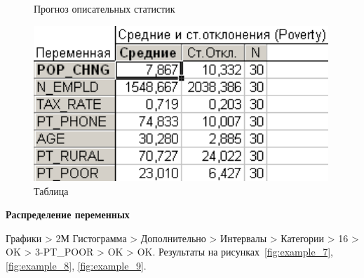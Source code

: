 \begin{figure}[!h]
\begin{minipage}{0.36\textwidth}
    \caption{Прогноз описательных статистик}
    \label{fig:example_5}
  \end{minipage}
  \begin{minipage}{0.24\textwidth}
    \centering

    \includegraphics[width=0.99\textwidth]
    {inc/example_6.PNG}

    \caption{Таблица}
    \label{fig:example_6}
  \end{minipage}
\end{figure}

\newpage

\begin{center}
  \textbf{Распределение переменных}
\end{center}

Графики > 2М Гистограмма > Дополнительно > Интервалы > Категории > 16 > OK
> 3-PT\_POOR > OK > OK. Результаты на рисунках~\ref{fig:example_7}, \ref{fig:example_8}, \ref{fig:example_9}.

